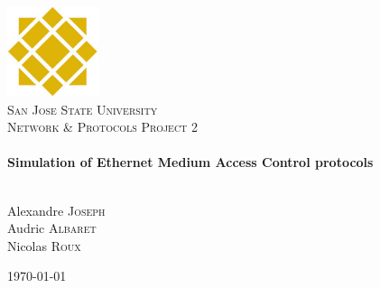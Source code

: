 \begin{titlepage}

\begin{center}


\includegraphics[width=0.20\textwidth]{./sjsu.jpg}\\[1cm]    

\textsc{\LARGE San Jose State University}\\[1.5cm]

\textsc{\Large Network \& Protocols Project 2}\\[0.5cm]


\HRule \\[0.6cm]
{ \huge \bfseries Simulation of Ethernet Medium Access Control protocols}\\[0.4cm]

\HRule \\[1.5cm]

\begin{center}
Alexandre \textsc{Joseph} \\
Audric \textsc{Albaret} \\
Nicolas \textsc{Roux} 
\end{center}
\vfill

{\large \today}

\end{center}

\end{titlepage}
